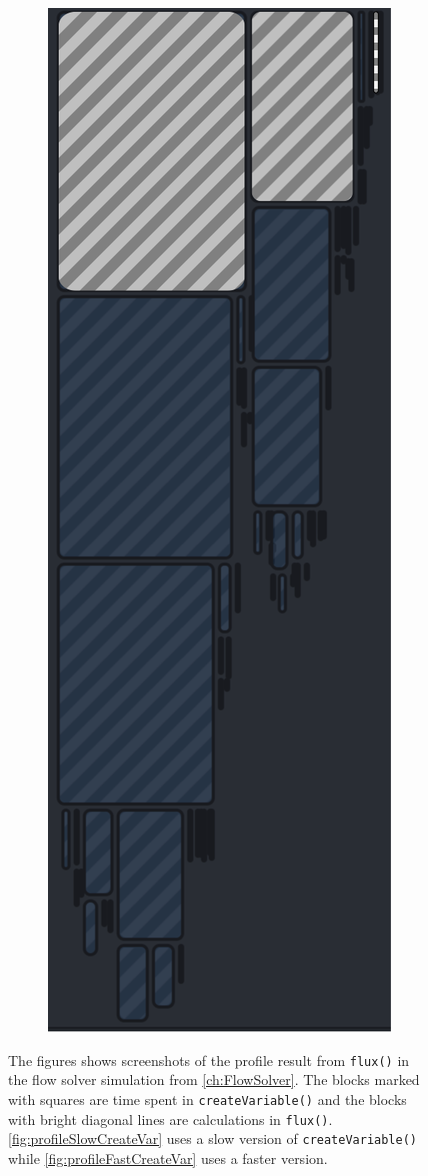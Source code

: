 \begin{figure}[H]
\begin{subfigure}[t]{0.18\textwidth}
        \includegraphics[height = 0.35\textheight, width=\textwidth]{figures/profilingFastCreateVariablesFlux.png}
        \caption{}
        \label{fig:profileFastCreateVar}
    \end{subfigure}
    \caption{The figures shows screenshots of the profile result from \texttt{flux()} in the flow solver simulation from \autoref{ch:FlowSolver}. The blocks marked with squares are time spent in \texttt{createVariable()} and the blocks with bright diagonal lines are calculations in \texttt{flux()}. \autoref{fig:profileSlowCreateVar} uses a slow version of \texttt{createVariable()} while \autoref{fig:profileFastCreateVar} uses a faster version.}
\end{figure}

